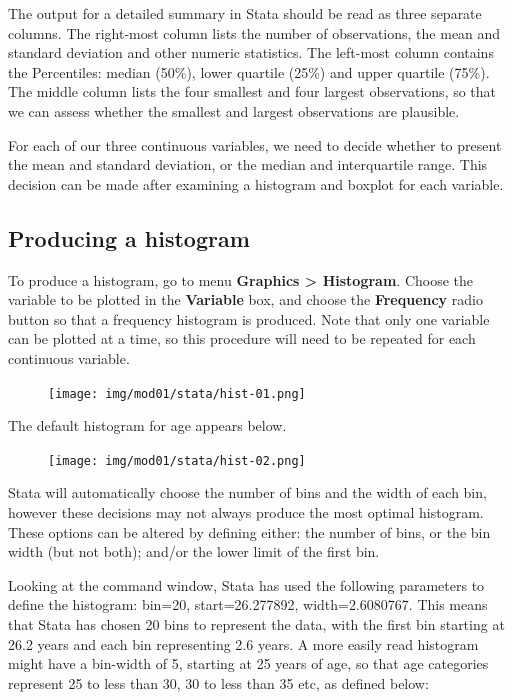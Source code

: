 \documentclass[
  a4paper,
]{memoir}
\begin{document}
The output for a detailed summary in Stata should be read as three
separate columns. The right-most column lists the number of
observations, the mean and standard deviation and other numeric
statistics. The left-most column contains the Percentiles: median
(50\%), lower quartile (25\%) and upper quartile (75\%). The middle
column lists the four smallest and four largest observations, so that we
can assess whether the smallest and largest observations are plausible.

For each of our three continuous variables, we need to decide whether to
present the mean and standard deviation, or the median and interquartile
range. This decision can be made after examining a histogram and boxplot
for each variable.

\hypertarget{producing-a-histogram}{%
\subsection{Producing a histogram}\label{producing-a-histogram}}

To produce a histogram, go to menu \textbf{Graphics \textgreater{}
Histogram}. Choose the variable to be plotted in the \textbf{Variable}
box, and choose the \textbf{Frequency} radio button so that a frequency
histogram is produced. Note that only one variable can be plotted at a
time, so this procedure will need to be repeated for each continuous
variable.

\begin{figure}[H]

{\centering \texttt{[image: img/mod01/stata/hist-01.png]}

}

\end{figure}

The default histogram for age appears below.

\begin{figure}[H]

{\centering \texttt{[image: img/mod01/stata/hist-02.png]}

}

\end{figure}

Stata will automatically choose the number of bins and the width of each
bin, however these decisions may not always produce the most optimal
histogram. These options can be altered by defining either: the number
of bins, or the bin width (but not both); and/or the lower limit of the
first bin.

Looking at the command window, Stata has used the following parameters
to define the histogram: bin=20, start=26.277892, width=2.6080767. This
means that Stata has chosen 20 bins to represent the data, with the
first bin starting at 26.2 years and each bin representing 2.6 years. A
more easily read histogram might have a bin-width of 5, starting at 25
years of age, so that age categories represent 25 to less than 30, 30 to
less than 35 etc, as defined below:
\end{document}
